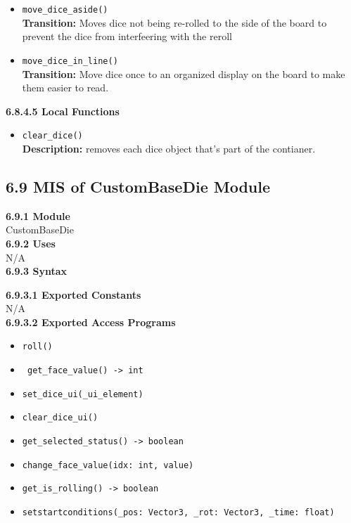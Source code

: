 \documentclass[12pt, titlepage]{article}
\begin{document}
\begin{itemize}
	\item \texttt{move\_dice\_aside() }\\
	\textbf{Transition:} Moves dice not being re-rolled to the side of the board to prevent the dice from interfeering with the reroll
	
	\item \texttt{move\_dice\_in\_line() }\\
	\textbf{Transition:} Move dice once to an organized display on the board to make them easier to read. 

	


\end{itemize}

\textbf{6.8.4.5 Local Functions}

\begin{itemize}
	
	\item \texttt{clear\_dice() }\\
	\textbf{Description:} removes each dice object that's part of the contianer. 
	
\end{itemize}


\subsection*{6.9 MIS of CustomBaseDie Module}
\textbf{6.9.1 Module}\\
 CustomBaseDie\\

\noindent \textbf{6.9.2 Uses}\\
N/A \\

\noindent \textbf{6.9.3 Syntax}

\noindent \textbf{6.9.3.1 Exported Constants}\\
N/A\\

\textbf{6.9.3.2 Exported Access Programs}
\begin{itemize}
	\item \texttt{roll() }
	\item \texttt{ get\_face\_value() -> int }
	\item \texttt{set\_dice\_ui(\_ui\_element) }
	\item \texttt{clear\_dice\_ui() }
	\item \texttt{get\_selected\_status() -> boolean}
	\item \texttt{change\_face\_value(idx: int, value) }
	\item \texttt{get\_is\_rolling() -> boolean }
	\item \texttt{setstartconditions(\_pos: Vector3, \_rot: Vector3, \_time: float) }
	
	
\end{itemize}
\end{document}
